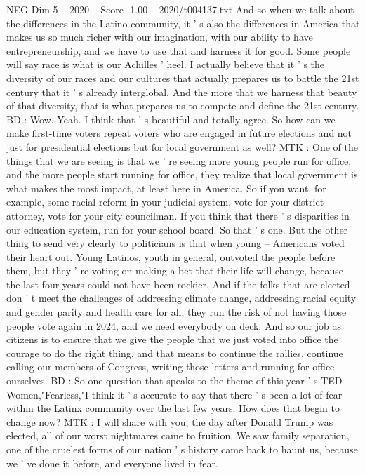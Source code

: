 \begin{textsample}{NEG Dim 5 – 2020 – Score -1.00 – 2020/t004137.txt}
And so when we talk about the differences in the Latino community, it ' s also the differences in America that makes us so much richer with our imagination, with our ability to have entrepreneurship, and we have to use that and harness it for good.
Some people will say race is what is our Achilles ' heel.
I actually believe that it ' s the diversity of our races and our cultures that actually prepares us to battle the 21st century that it ' s already interglobal.
And the more that we harness that beauty of that diversity, that is what prepares us to compete and define the 21st century.
BD : Wow.
Yeah.
I think that ' s beautiful and totally agree.
So how can we make first-time voters repeat voters who are engaged in future elections and not just for presidential elections but for local government as well?
MTK : One of the things that we are seeing is that we ' re seeing more young people run for office, and the more people start running for office, they realize that local government is what makes the most impact, at least here in America.
So if you want, for example, some racial reform in your judicial system, vote for your district attorney, vote for your city councilman.
If you think that there ' s disparities in our education system, run for your school board.
So that ' s one.
But the other thing to send very clearly to politicians is that when young -- Americans voted their heart out.
Young Latinos, youth in general, outvoted the people before them, but they ' re voting on making a bet that their life will change, because the last four years could not have been rockier.
And if the folks that are elected don ' t meet the challenges of addressing climate change, addressing racial equity and gender parity and health care for all, they run the risk of not having those people vote again in 2024, and we need everybody on deck.
And so our job as citizens is to ensure that we give the people that we just voted into office the courage to do the right thing, and that means to continue the rallies, continue calling our members of Congress, writing those letters and running for office ourselves.
BD : So one question that speaks to the theme of this year ' s TED Women,"Fearless,"I think it ' s accurate to say that there ' s been a lot of fear within the Latinx community over the last few years.
How does that begin to change now?
MTK : I will share with you, the day after Donald Trump was elected, all of our worst nightmares came to fruition.
We saw family separation, one of the cruelest forms of our nation ' s history came back to haunt us, because we ' ve done it before, and everyone lived in fear.

\end{textsample}
